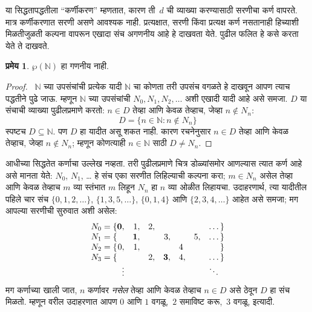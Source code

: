 \documentclass[11pt,a4paper,openany]{book}
\theoremstyle{definition}
\newtheorem{thm}[defn]{प्रमेय}
\newenvironment{explain}{}{}
\newcommand{\Setabs}[2]{\{#1:#2\}}
\newcommand{\Pow}[1]{\wp(#1)}
\newcommand{\Nat}{\mathbb{N}}
\begin{document}
\begin{explain}
या सिद्धतापद्धतीला ``कर्णीकरण'' म्हणतात, कारण ती~$d$ ची व्याख्या
करण्यासाठी सरणीचा कर्ण वापरते. मात्र कर्णीकरणात सरणी असणे आवश्यक नाही.
प्रत्यक्षात, सरणी किंवा प्रत्यक्ष कर्ण नसतानाही हिच्याशी मिळतीजुळती कल्पना
वापरून एखादा संच अगणनीय आहे हे दाखवता येते. पुढील फलित हे
कसे करता येते ते दाखवते.
\end{explain}

\begin{thm}
\label{sfr:siz:nen-alt:thm:nonenum-pownat}
$\Pow{\Nat}$ हा गणनीय नाही.
\end{thm}

\begin{proof}
~$\Nat$ च्या उपसंचांची प्रत्येक यादी $\Nat$ चा कोणता तरी उपसंच वगळते
हे दाखवून आपण त्याच पद्धतीने पुढे जाऊ. म्हणून $\Nat$ च्या उपसंचांची
$N_0, N_1, N_2, \ldots$ अशी एखादी यादी आहे असे समजा. $D$ या संचाची
व्याख्या पुढीलप्रमाणे करतो: $n \in D$ तेव्हा आणि केवळ तेव्हाच, जेव्हा
$n \notin N_{n}$:
\[
D = \Setabs{n \in \Nat}{n \notin N_n}
\]
स्पष्टच $D\subseteq \Nat$. पण $D$ हा यादीत असू शकत नाही. कारण
रचनेनुसार $n \in D$ तेव्हा आणि केवळ तेव्हाच, जेव्हा $n\notin N_n$;
म्हणून कोणत्याही $n \in \Nat$ साठी $D \neq N_n$.
\end{proof}

\begin{explain}
आधीच्या सिद्धतेत कर्णाचा उल्लेख नव्हता. तरी पुढीलप्रमाणे चित्र डोळ्यांसमोर
आणल्यास त्यात कर्ण आहे असे मानता येते: $N_0$, $N_1$, \dots{} हे संच
एका सरणीत लिहिल्याची कल्पना करा; $m \in N_n$ असेल तेव्हा आणि केवळ
तेव्हाच $m$ व्या स्तंभात $m$ लिहून $N_n$ हा $n$ व्या ओळीत लिहायचा.
उदाहरणार्थ, त्या यादीतील पहिले चार संच $\{0,1,2,\dots\}$,
$\{1, 3, 5, \dots\}$, $\{0,1,4\}$ आणि $\{2,3,4,\dots\}$ आहेत असे
समजा; मग आपल्या सरणीची सुरुवात अशी असेल:
\[
\begin{array}{r@{}rrrrrrr}
  N_0 = \{ & \mathbf{0}, & 1, & 2, & & & & \dots\}\\
  N_1 = \{ &  & \mathbf{1}, &  & 3, &  & 5, & \dots\}\\
  N_2 = \{ & 0, & 1, &  &  & 4\phantom{,} &  & \}\\
  N_3 = \{ &  &  & 2, & \mathbf{3}, & 4, & & \dots\}\\
  &\vdots & & & & & & \ddots\phantom{\}}
  \end{array}
\]
मग कर्णाच्या खाली जात, $n$ कर्णावर \emph{नसेल} तेव्हा आणि केवळ
तेव्हाच $n \in D$ असे ठेवून $D$ हा संच मिळतो. म्हणून वरील उदाहरणात
आपण $0$ आणि $1$ वगळू,~$2$ समाविष्ट करू,~$3$ वगळू, इत्यादी.
\end{explain}
\end{document}
